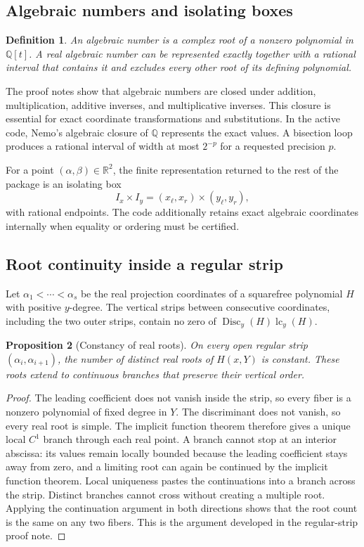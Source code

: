 \documentclass[11pt,a4paper]{article}
\newtheorem{definition}{Definition}[section]
\newtheorem{proposition}[definition]{Proposition}
\newcommand{\QQ}{\mathbb{Q}}
\newcommand{\RR}{\mathbb{R}}
\newcommand{\Disc}{\operatorname{Disc}}
\newcommand{\lc}{\operatorname{lc}}
\begin{document}
\subsection{Algebraic numbers and isolating boxes}

\begin{definition}
An algebraic number is a complex root of a nonzero polynomial in $\QQ[t]$.
A real algebraic number can be represented exactly together with a rational
interval that contains it and excludes every other root of its defining
polynomial.
\end{definition}

The proof notes show that algebraic numbers are closed under addition,
multiplication, additive inverses, and multiplicative inverses. This closure is essential for exact coordinate
transformations and substitutions. In the active code, Nemo's algebraic
closure of $\QQ$ represents the exact values. A bisection loop produces a
rational interval of width at most $2^{-p}$ for a requested precision $p$.

For a point $(\alpha,\beta)\in\RR^2$, the finite representation returned to
the rest of the package is an isolating box
\[
  I_x\times I_y
  = (x_{\ell},x_r)\times(y_{\ell},y_r),
\]
with rational endpoints. The code additionally retains exact algebraic
coordinates internally when equality or ordering must be certified.

\subsection{Root continuity inside a regular strip}

Let
$\alpha_1<\cdots<\alpha_s$ be the real projection coordinates of a squarefree
polynomial $H$ with positive $y$-degree. The vertical strips between consecutive
coordinates, including the two outer strips, contain no zero of
$\Disc_y(H)\lc_y(H)$.

\begin{proposition}[Constancy of real roots]
On every open regular strip $(\alpha_i,\alpha_{i+1})$, the number of distinct
real roots of $H(x,Y)$ is constant. These roots extend to continuous branches
that preserve their vertical order.
\end{proposition}

\begin{proof}
The leading coefficient does not vanish inside the strip, so every fiber is a
nonzero polynomial of fixed degree in $Y$. The discriminant does not vanish,
so every real root is simple. The implicit function theorem therefore gives a
unique local $C^1$ branch through each real point. A branch cannot stop at an
interior abscissa: its values remain locally bounded because the leading
coefficient stays away from zero, and a limiting root can again be continued
by the implicit function theorem. Local uniqueness pastes the continuations
into a branch across the strip. Distinct branches cannot cross without
creating a multiple root. Applying the continuation argument in both
directions shows that the root count is the same on any two fibers. This is
the argument developed in the regular-strip proof note.
\end{proof}
\end{document}
